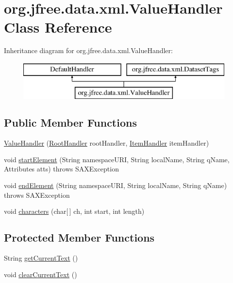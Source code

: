 \hypertarget{classorg_1_1jfree_1_1data_1_1xml_1_1_value_handler}{}\section{org.\+jfree.\+data.\+xml.\+Value\+Handler Class Reference}
\label{classorg_1_1jfree_1_1data_1_1xml_1_1_value_handler}
Inheritance diagram for org.\+jfree.\+data.\+xml.\+Value\+Handler\+:\begin{figure}[H]
\begin{center}
\leavevmode
\includegraphics[height=2.000000cm]{classorg_1_1jfree_1_1data_1_1xml_1_1_value_handler}
\end{center}
\end{figure}
\subsection*{Public Member Functions}
\begin{DoxyCompactItemize}
\item 
\mbox{\hyperlink{classorg_1_1jfree_1_1data_1_1xml_1_1_value_handler_a91dbc9d98407018855bc3ae074b4f209}{Value\+Handler}} (\mbox{\hyperlink{classorg_1_1jfree_1_1data_1_1xml_1_1_root_handler}{Root\+Handler}} root\+Handler, \mbox{\hyperlink{classorg_1_1jfree_1_1data_1_1xml_1_1_item_handler}{Item\+Handler}} item\+Handler)
\item 
void \mbox{\hyperlink{classorg_1_1jfree_1_1data_1_1xml_1_1_value_handler_af90a66fd0d1ca9cb26e2dc635510a24d}{start\+Element}} (String namespace\+U\+RI, String local\+Name, String q\+Name, Attributes atts)  throws S\+A\+X\+Exception 
\item 
void \mbox{\hyperlink{classorg_1_1jfree_1_1data_1_1xml_1_1_value_handler_aa5a2d0c3c9352a1e638a497c0ebf04bf}{end\+Element}} (String namespace\+U\+RI, String local\+Name, String q\+Name)  throws S\+A\+X\+Exception 
\item 
void \mbox{\hyperlink{classorg_1_1jfree_1_1data_1_1xml_1_1_value_handler_a112f063d621e58b138aa2e05dc532051}{characters}} (char\mbox{[}$\,$\mbox{]} ch, int start, int length)
\end{DoxyCompactItemize}
\subsection*{Protected Member Functions}
\begin{DoxyCompactItemize}
\item 
String \mbox{\hyperlink{classorg_1_1jfree_1_1data_1_1xml_1_1_value_handler_a8db816c8436e6dbf7b4e75bbd275b4e2}{get\+Current\+Text}} ()
\item 
void \mbox{\hyperlink{classorg_1_1jfree_1_1data_1_1xml_1_1_value_handler_a8dc53207b50da4e0e24e2bea7e05c592}{clear\+Current\+Text}} ()
\end{DoxyCompactItemize}
